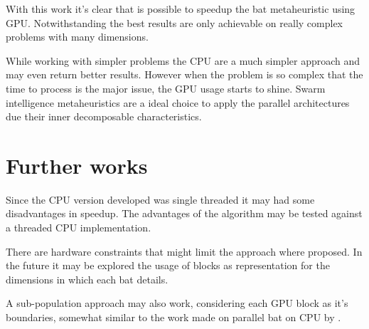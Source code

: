 \documentclass[conference]{IEEEtran}
\begin{document}
With this work it's clear that is possible to speedup the bat
metaheuristic using GPU. Notwithstanding the best results are only
achievable on really complex problems with many dimensions.

While working with simpler problems the CPU are a much simpler approach
and may even return better results. However when the problem is so
complex that the time to process is the major issue, the GPU usage
starts to shine. Swarm intelligence metaheuristics are a ideal choice to
apply the parallel architectures due their inner decomposable characteristics.

\section{Further works} %

Since the CPU version developed was single threaded it may had some
disadvantages in speedup. The advantages of the algorithm may be tested
against a threaded CPU implementation.

There are hardware constraints that might limit the approach where
proposed. In the future it may be explored the usage of blocks as
representation for the dimensions in which each bat details.

A sub-population approach may also work, considering each GPU block as
it's boundaries, somewhat similar to the work made on parallel bat on
CPU by \cite{paralellCPU}.

\end{document}
